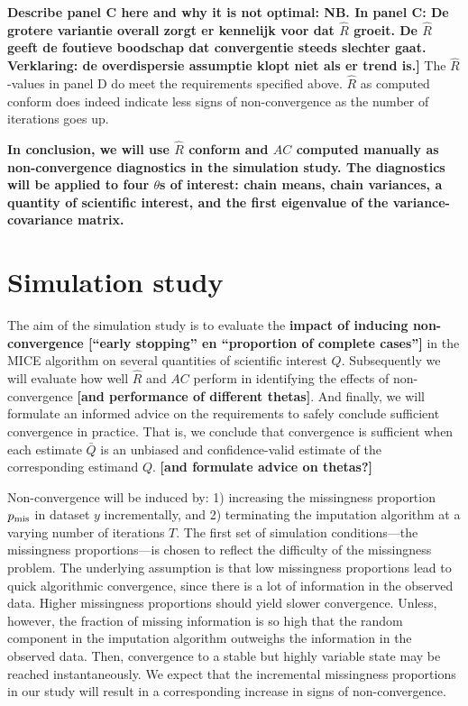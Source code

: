 \documentclass[Royal,times,sageh]{sagej}
\begin{document}
\textbf{Describe panel C here and why it is not optimal: NB. In panel C: De grotere variantie overall zorgt er kennelijk voor dat \(\widehat{R}\) groeit. De \(\widehat{R}\) geeft de foutieve boodschap dat convergentie steeds slechter gaat. Verklaring: de overdispersie assumptie klopt niet als er trend is.{]}} The \(\widehat{R}\)-values in panel D do meet the requirements specified above. \(\widehat{R}\) as computed conform \citet{veht19} does indeed indicate less signs of non-convergence as the number of iterations goes up. \textbf{\citep[explain the dip in Rhat values at t=2. Namely, because we can only use 2 of the 3 tricks by][ if the number of iterations is very low (t\textless4). That's why the \(\widehat{R}\)s are more similar to the traditional GR.]{veht19}}

\textbf{In conclusion, we will use \(\widehat{R}\) conform \citet{veht19} and \(AC\) computed manually as non-convergence diagnostics in the simulation study. The diagnostics will be applied to four \(\theta\)s of interest: chain means, chain variances, a quantity of scientific interest, and the first eigenvalue of the variance-covariance matrix.}

\hypertarget{simulation-study}{%
\section{Simulation study}\label{simulation-study}}

The aim of the simulation study is to evaluate the \textbf{impact of inducing non-convergence {[}``early stopping'' en ``proportion of complete cases''{]}} in the MICE algorithm on several quantities of scientific interest \(Q\). Subsequently we will evaluate how well \(\widehat{R}\) and \(AC\) perform in identifying the effects of non-convergence \textbf{{[}and performance of different thetas{]}}. And finally, we will formulate an informed advice on the requirements to safely conclude sufficient convergence in practice. That is, we conclude that convergence is sufficient when each estimate \(\bar{Q}\) is an unbiased and confidence-valid estimate of the corresponding estimand \(Q\). \textbf{{[}and formulate advice on thetas?{]}}

Non-convergence will be induced by: 1) increasing the missingness proportion \(p_{\rm mis}\) in dataset \(y\) incrementally, and 2) terminating the imputation algorithm at a varying number of iterations \(T\). The first set of simulation conditions---the missingness proportions---is chosen to reflect the difficulty of the missingness problem. The underlying assumption is that low missingness proportions lead to quick algorithmic convergence, since there is a lot of information in the observed data. Higher missingness proportions should yield slower convergence. Unless, however, the fraction of missing information is so high that the random component in the imputation algorithm outweighs the information in the observed data. Then, convergence to a stable but highly variable state may be reached instantaneously. We expect that the incremental missingness proportions in our study will result in a corresponding increase in signs of non-convergence.
\end{document}
